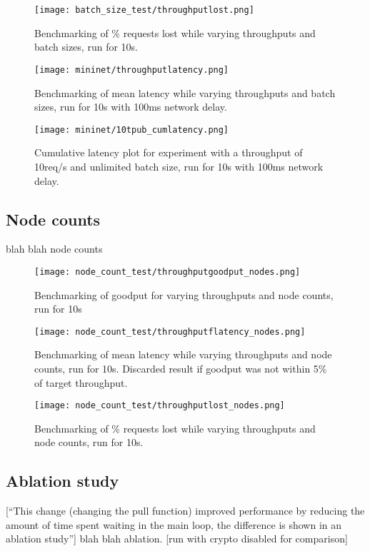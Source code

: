 \begin{figure}[h!]
\centering
\texttt{[image: batch\_size\_test/throughputlost.png]}
\caption{Benchmarking of \% requests lost while varying throughputs and batch sizes, run for 10s.}
\end{figure}

\begin{figure}[h!]
\centering
\texttt{[image: mininet/throughputlatency.png]}
\caption{Benchmarking of mean latency while varying throughputs and batch sizes, run for 10s with 100ms network delay.}
\end{figure}

\begin{figure}[h!]
\centering
\texttt{[image: mininet/10tpub\_cumlatency.png]}
\caption{Cumulative latency plot for experiment with a throughput of 10req/s and unlimited batch size, run for 10s with 100ms network delay.}
\end{figure}

\subsection{Node counts}
blah blah node counts

\begin{figure}[h!]
\centering
\texttt{[image: node\_count\_test/throughputgoodput\_nodes.png]}
\caption{Benchmarking of goodput for varying throughputs and node counts, run for 10s}
\end{figure}

\begin{figure}[h!]
\centering
\texttt{[image: node\_count\_test/throughputflatency\_nodes.png]}
\caption{Benchmarking of mean latency while varying throughputs and node counts, run for 10s. Discarded result if goodput was not within 5\% of target throughput.}
\end{figure}

\begin{figure}[h!]
\centering
\texttt{[image: node\_count\_test/throughputlost\_nodes.png]}
\caption{Benchmarking of \% requests lost while varying throughputs and node counts, run for 10s.}
\end{figure}

\subsection{Ablation study} \label{ablation}
[``This change (changing the pull function) improved performance by reducing the amount of time spent waiting in the main loop, the difference is shown in an ablation study'']
blah blah ablation.
[run with crypto disabled for comparison]


